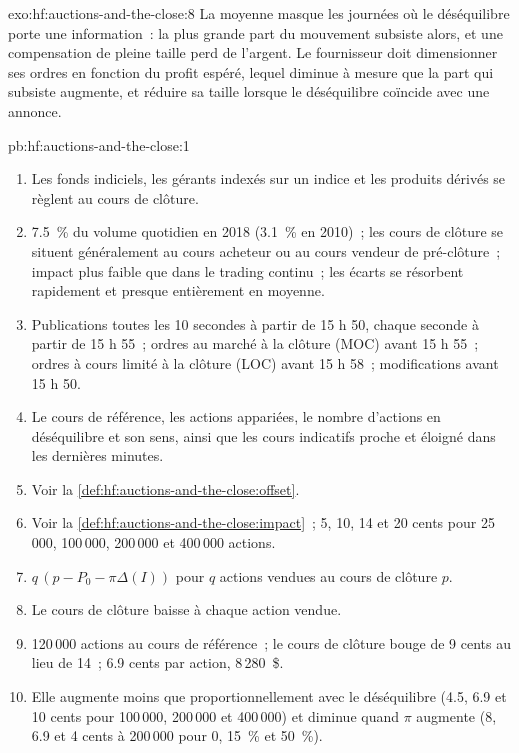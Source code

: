 \begin{solution}{exo:hf:auctions-and-the-close:8}
La moyenne masque les journées où le déséquilibre porte une information~: la plus grande part du mouvement subsiste alors, et une compensation de pleine taille perd de l'argent. Le fournisseur doit dimensionner ses ordres en fonction
du profit espéré, lequel diminue à mesure que la part qui subsiste augmente, et réduire sa taille lorsque le déséquilibre coïncide avec une annonce.
\end{solution}

\begin{solution}{pb:hf:auctions-and-the-close:1}
\begin{enumerate}
\item Les fonds indiciels, les gérants indexés sur un indice et les produits dérivés se règlent au cours de clôture.
\item 7.5~\% du volume quotidien en 2018 (3.1~\% en 2010)~; les cours de clôture se situent généralement au cours acheteur ou au cours vendeur de pré-clôture~; impact plus faible que dans le trading continu~;
les écarts se résorbent rapidement et presque entièrement en moyenne.
\item Publications toutes les 10 secondes à partir de 15 h 50, chaque seconde à partir de 15 h 55~; ordres au marché à la clôture (MOC) avant 15 h 55~; ordres à cours limité à la clôture (LOC) avant 15 h 58~;
modifications avant 15 h 50.
\item Le cours de référence, les actions appariées, le nombre d'actions en déséquilibre et son sens, ainsi que les cours indicatifs proche et éloigné dans les dernières minutes.
\item Voir la \cref{def:hf:auctions-and-the-close:offset}.
\item Voir la \cref{def:hf:auctions-and-the-close:impact}~; 5, 10, 14 et 20 cents pour 25\,000, 100\,000, 200\,000 et 400\,000 actions.
\item $q\,(p-P_0-\pi\Delta(I))$ pour $q$ actions vendues au cours de clôture $p$.
\item Le cours de clôture baisse à chaque action vendue.
\item 120\,000 actions au cours de référence~; le cours de clôture bouge de 9 cents au lieu de 14~; 6.9 cents par action, 8\,280~\$.
\item Elle augmente moins que proportionnellement avec le déséquilibre (4.5, 6.9 et 10 cents pour 100\,000, 200\,000 et 400\,000) et diminue quand $\pi$ augmente (8, 6.9 et 4
cents à 200\,000 pour 0, 15~\% et 50~\%).

\end{enumerate}
\end{solution}
